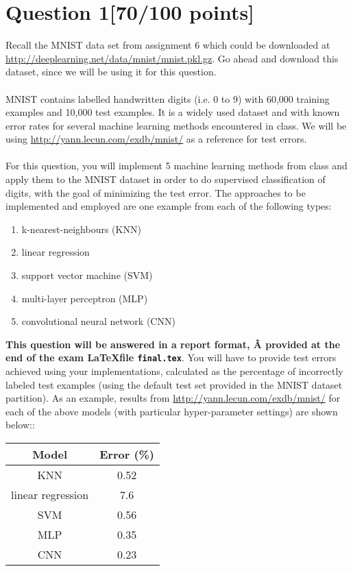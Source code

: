 \documentclass{article}
\begin{document}
\section*{Question 1\hspace{10cm}[70/100 points]}
Recall the MNIST data set from assignment 6 which could be downloaded at \url{http://deeplearning.net/data/mnist/mnist.pkl.gz}. Go ahead and download this dataset, since we will be using it for this question.\\
\\
MNIST contains labelled handwritten digits (i.e. 0 to 9) with 60,000 training examples and 10,000 test examples. It is a widely used dataset and with known error rates for several machine learning methods encountered in class. We will be using \url{http://yann.lecun.com/exdb/mnist/} as a reference for test errors.\\
\\
For this question, you will implement 5 machine learning methods from class and apply them to the MNIST dataset in order to do supervised classification of digits, with the goal of minimizing the test error. The approaches to be implemented and employed are one example from each of the following types:
\begin{enumerate}
    \item k-nearest-neighbours (KNN)
    \item linear regression
    \item support vector machine (SVM)
    \item multi-layer perceptron (MLP)
    \item convolutional neural network (CNN)
\end{enumerate}
\textbf{This question will be answered in a report format, Â provided at the end of the exam \LaTeX file \texttt{final.tex}}. You will have to provide test errors achieved using your implementations, calculated as the percentage of incorrectly labeled test examples (using the default test set provided in the MNIST dataset partition). As an example, results from \url{http://yann.lecun.com/exdb/mnist/} for each of the above models (with particular hyper-parameter settings) are shown below::\\
\begin{center}
 \begin{tabular}{|c | c |} 
 \hline
 Model & Error (\%) \\ [0.5ex]
 \hline\hline
 KNN & 0.52 \\
 linear regression & 7.6 \\
 SVM & 0.56 \\
 MLP & 0.35 \\
 CNN & 0.23 \\ 
 \hline 
\end{tabular}
\end{center}
\end{document}
